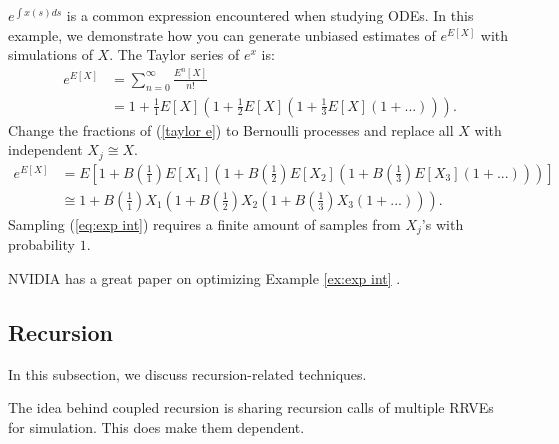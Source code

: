 \documentclass[a4paper,12pt]{article}
\begin{document}
\begin{example}[$e^{E[X]}$] \label{ex:exp int}
    $e^{\int x(s)ds}$ is a common expression encountered when studying ODEs.
    In this example, we demonstrate how you can generate unbiased estimates of
    $e^{E[X]}$ with simulations of $X$. The Taylor series of $e^{x}$ is:
    \begin{align}
        e^{E[X]} & = \sum_{n=0}^{\infty} \frac{E^{n}[X]}{n!}     \\
                 & = 1 + \frac{1}{1}E[X]\left(1+ \frac{1}{2}E[X]
        \left(1+\frac{1}{3}E[X]\left(1+ ...\right)\right)\right). \label{taylor e}
    \end{align}
    Change the fractions of (\ref{taylor e}) to Bernoulli processes
    and replace all $X$ with independent $X_j \cong X$.
    \begin{align}
        e^{E[X]} & = E
        \left[1 + B\left(\frac{1}{1}\right)E[X_1]
        \left(1+ B\left(\frac{1}{2}\right)E[X_2]
        \left(1+B\left(\frac{1}{3}\right)E[X_3]
        \left(1+ ...\right)
        \right)
        \right)
        \right]                             \\
                 & \cong \label{eq:exp int}
        1 + B\left(\frac{1}{1}\right)X_1
        \left(1+ B\left(\frac{1}{2}\right)X_2
        \left(1+B\left(\frac{1}{3}\right)X_3
            \left(1+ ...\right)
            \right)
        \right).
    \end{align}
    Sampling (\ref{eq:exp int}) requires a finite amount of samples from $X_{j}$'s
    with probability $1$.
\end{example}

\begin{related}
    NVIDIA has a great paper on optimizing Example \ref{ex:exp int}
    \cite{kettunen_unbiased_2021}.
\end{related}

\subsection{Recursion}

In this subsection, we discuss recursion-related techniques.

\begin{technique}
    The idea behind coupled recursion is sharing recursion calls of
    multiple RRVEs for simulation. This does make them dependent.
\end{technique}
\end{document}
